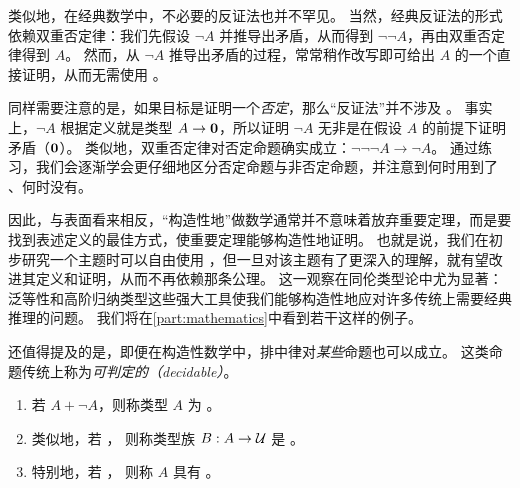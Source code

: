 类似地，在经典数学中，不必要的反证法也并不罕见。
%
当然，经典反证法的形式依赖双重否定律：我们先假设 $\neg A$ 并推导出矛盾，从而得到 $\neg \neg A$，再由双重否定律得到 $A$。
然而，从 $\neg A$ 推导出矛盾的过程，常常稍作改写即可给出 $A$ 的一个直接证明，从而无需使用 \LEM{}。

同样需要注意的是，如果目标是证明一个\emph{否定}，那么“反证法”并不涉及 \LEM{}。
事实上，$\neg A$ 根据定义就是类型 $A\to\mathbf{0}$，所以证明 $\neg A$ 无非是在假设 $A$ 的前提下证明矛盾（$\mathbf{0}$）。
类似地，双重否定律对否定命题确实成立：$\neg\neg\neg A \to \neg A$。
通过练习，我们会逐渐学会更仔细地区分否定命题与非否定命题，并注意到何时用到了 \LEM{}、何时没有。

因此，与表面看来相反，“构造性地”做数学通常并不意味着放弃重要定理，而是要找到表述定义的最佳方式，使重要定理能够构造性地证明。
也就是说，我们在初步研究一个主题时可以自由使用 \LEM{}，但一旦对该主题有了更深入的理解，就有望改进其定义和证明，从而不再依赖那条公理。
这一观察在同伦类型论中尤为显著：泛等性和高阶归纳类型这些强大工具使我们能够构造性地应对许多传统上需要经典推理的问题。
我们将在\cref{part:mathematics}中看到若干这样的例子。

还值得提及的是，即便在构造性数学中，排中律对\emph{某些}命题也可以成立。
这类命题传统上称为\emph{可判定的（decidable）}。

\begin{defn}\label{defn:decidable-equality}
  \mbox{}
  \begin{enumerate}
  \item 若 $A+\neg A$，则称类型 $A$ 为
    。
  \item 类似地，若 ， 则称类型族 $B:A\to \mathcal{U}$ 是
    。 \label{item:decidable-equality2}
  \item 特别地，若 ， 则称 $A$ 具有
    。
  \end{enumerate}
\end{defn}

